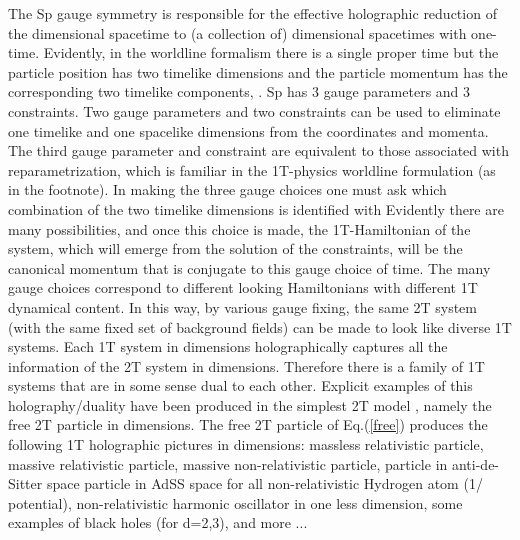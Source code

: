 \documentclass[a4paper,12pt]{article}
\begin{document}
The Sp\coordHE{} gauge symmetry is responsible for the
effective holographic reduction of the \coordHE{} dimensional spacetime
to (a collection of) \coordHE{} dimensional spacetimes with one-time.
Evidently, in the worldline formalism there is a single proper
time \myHighlight{$\tau ,$}\coordHE{} but the particle position \coordHE{} has two timelike dimensions \coordHE{} and the particle momentum \coordHE{} has the corresponding two timelike
components, \coordHE{}. Sp\coordHE{} has 3 gauge parameters and 3
constraints. Two gauge parameters and two constraints can be used
to eliminate one timelike and one spacelike dimensions from the
coordinates and momenta. The third gauge parameter and constraint
are equivalent to those associated with \myHighlight{$\tau $}\coordHE{} reparametrization,
which is familiar in the 1T-physics worldline formulation (as in
the footnote). In making the three gauge choices one must ask
which combination of the two timelike dimensions is identified
with \coordHE{} Evidently there are many possibilities, and once
this choice is made, the 1T-Hamiltonian of the system, which will
emerge from the solution of the constraints, will be the canonical
momentum that is conjugate to this gauge choice of time. The many
gauge choices correspond to different looking Hamiltonians with
different 1T dynamical content. In this way, by various gauge
fixing, the same 2T system (with the same fixed set of background
fields) can be made to look like diverse 1T systems. Each 1T
system in \coordHE{} dimensions holographically captures all the
information of the 2T system in \coordHE{} dimensions. Therefore there
is a family of 1T systems that are in some sense dual to each
other. Explicit examples of this holography/duality have been
produced in the simplest 2T model \cite{old2T}, namely the free 2T
particle in \coordHE{} dimensions. The free 2T particle of
Eq.(\ref{free}) produces the following 1T holographic pictures in
\coordHE{} dimensions: massless relativistic particle, massive
relativistic particle, massive non-relativistic particle, particle
in anti-de-Sitter space \coordHE{} particle in AdS\coordHE{}S\coordHE{} space for all \coordHE{} non-relativistic Hydrogen atom
(1/\coordHE{} potential), non-relativistic harmonic oscillator in one
less dimension, some examples of black holes (for d=2,3), and more
...
\end{document}
